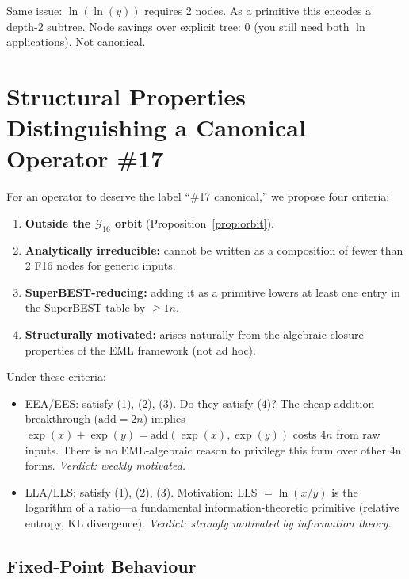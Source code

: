 \documentclass[11pt]{article}
\begin{document}
\noindent Same issue: $\ln(\ln(y))$ requires 2 nodes. As a primitive this
encodes a depth-2 subtree. Node savings over explicit tree: 0
(you still need both $\ln$ applications). Not canonical.

\section{Structural Properties Distinguishing a Canonical Operator \#17}
\label{sec:structural}

For an operator to deserve the label ``\#17 canonical,'' we propose four criteria:

\begin{enumerate}
  \item \textbf{Outside the $\mathcal{G}_{16}$ orbit} (Proposition~\ref{prop:orbit}).
  \item \textbf{Analytically irreducible:} cannot be written as a composition of
        fewer than 2 F16 nodes for generic inputs.
  \item \textbf{SuperBEST-reducing:} adding it as a primitive lowers at least one
        entry in the SuperBEST table by $\geq 1n$.
  \item \textbf{Structurally motivated:} arises naturally from the algebraic
        closure properties of the EML framework (not ad hoc).
\end{enumerate}

\noindent Under these criteria:
\begin{itemize}
  \item EEA/EES: satisfy (1), (2), (3). Do they satisfy (4)?
    The cheap-addition breakthrough ($\mathrm{add} = 2n$) implies
    $\exp(x) + \exp(y) = \mathrm{add}(\exp(x), \exp(y))$ costs $4n$ from raw inputs.
    There is no EML-algebraic reason to privilege this form over other 4n forms.
    \emph{Verdict: weakly motivated.}
  \item LLA/LLS: satisfy (1), (2), (3). Motivation: LLS $= \ln(x/y)$ is the
    logarithm of a ratio---a fundamental information-theoretic primitive (relative
    entropy, KL divergence). \emph{Verdict: strongly motivated by information theory.}
\end{itemize}

\subsection{Fixed-Point Behaviour}
\end{document}
